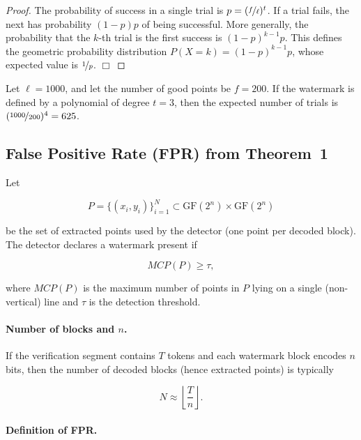 \documentclass[a4paper,11pt]{llncs}
\newcommand{\GF}{\mathrm{GF}}
\begin{document}
\begin{proof}
    The probability of success in a single trial is $p = (\nicefrac{f}{\ell})^{t}$. If a trial fails, the next has probability $(1 - p)p$ of being successful. More generally, the probability that the $k$-th trial is the first success is $(1 - p)^{k-1}p$. This defines the geometric probability distribution $P(X = k) = (1 - p)^{k-1}p$, whose expected value is $\nicefrac{1}{p}$. \hfill $\Box$ 
\end{proof}

\begin{example}
    Let $\ell = 1000$, and let the number of good points be $f = 200$. If the watermark is defined by a polynomial of degree $t = 3$, then the expected number of trials is $(\nicefrac{1000}{200})^4 = 625$.
\end{example}


\subsection{False Positive Rate (FPR) from Theorem~1}
\label{app:fpr}

Let

\[
    P=\{(x_i,y_i)\}_{i=1}^{N}\subset \GF(2^n)\times \GF(2^n)
\]

be the set of extracted points used by the detector (one point per decoded
block). The detector declares a watermark present if

\[
    MCP(P)\ge \tau,
\]

where $MCP(P)$ is the maximum number of points in $P$ lying on a single
(non-vertical) line and $\tau$ is the detection threshold.

\paragraph{Number of blocks and $n$.}

If the verification segment contains $T$ tokens and each watermark block encodes $n$ bits, then the number of decoded blocks (hence extracted points) is typically

\begin{equation}
\label{eq:num-blocks}
    N \approx \left\lfloor \frac{T}{n}\right\rfloor .
\end{equation}

\paragraph{Definition of FPR.}
\end{document}
